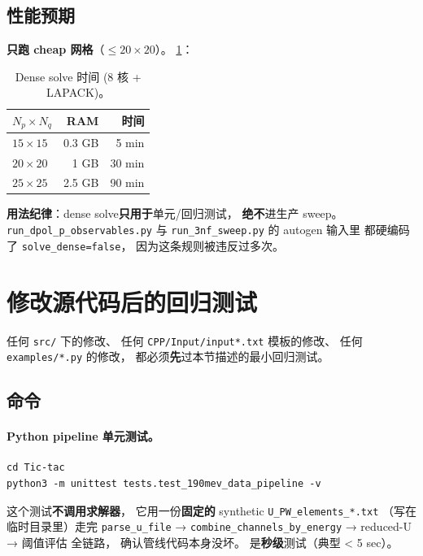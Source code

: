 \subsection{性能预期}
\label{sec:ch20-s5-perf}

\textbf{只跑 cheap 网格}（$\le 20 \times 20$）。
\cref{tab:ch20-s5-time}：

\begin{table}[ht]
\centering
\small
\caption{Dense solve 时间 (8 核 + LAPACK)。}
\label{tab:ch20-s5-time}
\begin{tabular}{@{}lrr@{}}
\toprule
$N_p \times N_q$ & RAM & 时间 \\
\midrule
$15 \times 15$ & 0.3 GB & 5 min  \\
$20 \times 20$ & 1 GB   & 30 min \\
$25 \times 25$ & 2.5 GB & 90 min \\
\bottomrule
\end{tabular}
\end{table}

\textbf{用法纪律}：dense solve\textbf{只用于}单元/回归测试，
\textbf{绝不}进生产 sweep。
\texttt{run\_dpol\_p\_observables.py} 与 \texttt{run\_3nf\_sweep.py} 的 autogen 输入里
都硬编码了 \texttt{solve\_dense=false}，
因为这条规则被违反过多次。

\section{修改源代码后的回归测试}
\label{sec:ch20-regression}

任何 \texttt{src/} 下的修改、
任何 \texttt{CPP/Input/input*.txt} 模板的修改、
任何 \texttt{examples/*.py} 的修改，
都必须\textbf{先}过本节描述的最小回归测试。

\subsection{命令}
\label{sec:ch20-reg-cmd}

\paragraph{Python pipeline 单元测试。}
\begin{lstlisting}[style=config,caption={核心 pipeline 单元测试，不需要 CPP/run。}]
cd Tic-tac
python3 -m unittest tests.test_190mev_data_pipeline -v
\end{lstlisting}
这个测试\textbf{不调用求解器}，
它用一份\textbf{固定的} synthetic \texttt{U\_PW\_elements\_*.txt}
（写在临时目录里）走完
\texttt{parse\_u\_file} → \texttt{combine\_channels\_by\_energy} → reduced-U → 阈值评估
全链路，
确认管线代码本身没坏。
是\textbf{秒级}测试（典型 < 5 sec）。

